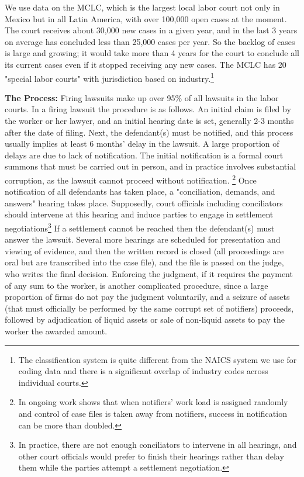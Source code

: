 \documentclass[11pt]{article}
\begin{document}
We use data on the MCLC, which is the largest local labor court not only in Mexico but in all Latin America, with over 100,000 open cases at the moment. The court receives about 30,000 new cases in a given year, and in the last 3 years on average has concluded less than 25,000 cases per year. So the backlog of cases is large and growing; it would take more than 4 years for the court to conclude all its current cases even if it stopped receiving any new cases.  The MCLC has 20 "special labor courts" with jurisdiction based on industry.\footnote{The classification system is quite different from the NAICS system we use for coding data and there is a significant overlap of industry codes across individual courts.}

\textbf{The Process:} Firing lawsuits make up over 95\% of all lawsuits in the labor courts. In a firing lawsuit the procedure is as follows. An initial claim is filed by the worker or her lawyer, and an initial hearing date is set, generally 2-3 months after the date of filing. Next, the defendant(s) must be notified, and this process usually implies at least 6 months' delay in the lawsuit. A large proportion of delays are due to lack of notification. The initial notification is a formal court summons that must be carried out in person, and in practice involves substantial corruption, as the lawsuit cannot proceed without notification. \footnote{In ongoing work \cite{KaplanSadka_notif} shows that when notifiers' work load is assigned randomly and control of case files is taken away from notifiers, success in notification can be more than doubled. } Once notification of all defendants has taken place, a "conciliation, demands, and answers" hearing takes place. Supposedly, court officials including conciliators should intervene at this hearing and induce parties to engage in settlement negotiations\footnote{In practice, there are not enough conciliators to intervene in all hearings, and other court officials would prefer to finish their hearings rather than delay them while the parties attempt a settlement negotiation.} If a settlement cannot be reached then the defendant(s) must answer the lawsuit. Several more hearings are scheduled for presentation and viewing of evidence, and then the written record is closed (all proceedings are oral but are transcribed into the case file), and the file is passed on the judge, who writes the final decision. Enforcing the judgment, if it requires the payment of any sum to the worker, is another complicated procedure, since a large proportion of firms do not pay the judgment voluntarily, and a seizure of assets (that must officially be performed by the same corrupt set of notifiers) proceeds, followed by adjudication of liquid assets or sale of non-liquid assets to pay the worker the awarded amount. 
\end{document}
